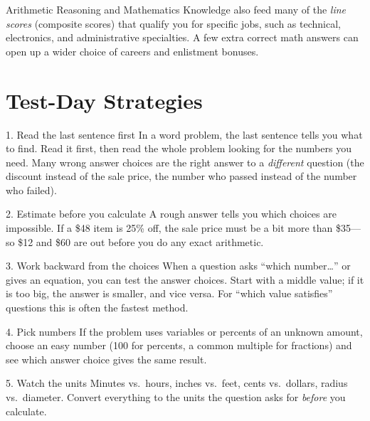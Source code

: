 Arithmetic Reasoning and Mathematics Knowledge also feed many of the
\emph{line scores} (composite scores) that qualify you for specific jobs, such
as technical, electronics, and administrative specialties. A few extra correct
math answers can open up a wider choice of careers and enlistment bonuses.

\chapter*{Test-Day Strategies}

\begin{concept}{1. Read the last sentence first}
In a word problem, the last sentence tells you what to find. Read it first,
then read the whole problem looking for the numbers you need. Many wrong
answer choices are the right answer to a \emph{different} question (the
discount instead of the sale price, the number who passed instead of the
number who failed).
\end{concept}

\begin{concept}{2. Estimate before you calculate}
A rough answer tells you which choices are impossible. If a \$48 item is
25\% off, the sale price must be a bit more than \$35---so \$12 and \$60 are
out before you do any exact arithmetic.
\end{concept}

\begin{concept}{3. Work backward from the choices}
When a question asks ``which number\ldots'' or gives an equation, you can test
the answer choices. Start with a middle value; if it is too big, the answer is
smaller, and vice versa. For ``which value satisfies'' questions this is often
the fastest method.
\end{concept}

\begin{concept}{4. Pick numbers}
If the problem uses variables or percents of an unknown amount, choose an easy
number (100 for percents, a common multiple for fractions) and see which
answer choice gives the same result.
\end{concept}

\begin{concept}{5. Watch the units}
Minutes vs.\ hours, inches vs.\ feet, cents vs.\ dollars, radius vs.\
diameter. Convert everything to the units the question asks for
\emph{before} you calculate.
\end{concept}

